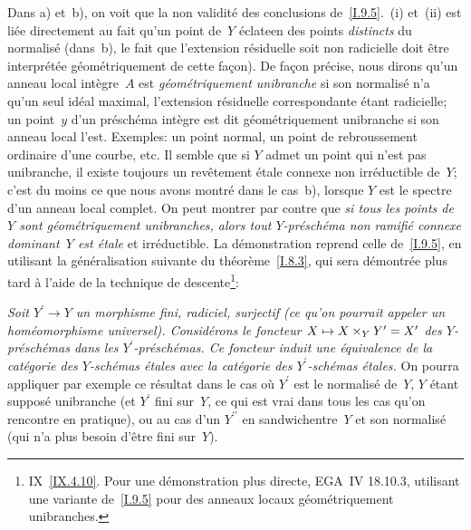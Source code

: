 Dans a) et~b), on voit que la non validit\'e des conclusions
de~\ref{I.9.5}.\, (i) et~(ii) est li\'ee directement au fait qu'un
point de~$Y$ \og \'eclate\fg en des points \emph{distincts} du
normalis\'e (dans~b),
le fait que l'extension r\'esiduelle soit non radicielle
doit \^etre interpr\'et\'ee g\'eom\'etriquement de cette
fa\c con). De fa\c con pr\'ecise, nous dirons qu'un anneau local
int\`egre~$A$ est \emph{géométriquement unibranche}
si son normalis\'e n'a qu'un seul id\'eal maximal, l'extension
r\'esiduelle correspondante \'etant radicielle; un point~$y$ d'un
pr\'esch\'ema int\`egre est dit g\'eom\'etriquement
unibranche si son anneau local l'est. Exemples: un point normal, un
point de rebroussement ordinaire d'une courbe, etc. Il semble que si
$Y$ admet un point qui
n'est pas unibranche, il existe toujours
un
rev\^etement \'etale
connexe non irr\'eductible de~$Y$; c'est du moins ce que nous avons
montr\'e dans le cas~b), lorsque $Y$ est le spectre d'un anneau
local complet. On peut montrer par contre que \emph{si tous les points
de~$Y$ sont géométriquement unibranches, alors tout
$Y$-préschéma non ramifié connexe dominant~$Y$ est
étale} et irr\'eductible. La d\'emonstration reprend celle
de~\ref{I.9.5}, en utilisant la g\'en\'eralisation suivante du
th\'eor\`eme~\ref{I.8.3}, qui sera d\'emontr\'ee plus tard
\`a l'aide de la technique de
descente\footnote{\Cf IX~\ref{IX.4.10}. Pour une d\'emonstration
plus directe, \cf EGA~IV 18.10.3, utilisant une variante
de~\ref{I.9.5} pour des anneaux locaux g\'eom\'etriquement
unibranches.}:

\emph{Soit $Y^\prime \to Y$ un morphisme fini, radiciel, surjectif
(\ie ce qu'on pourrait appeler un \og homéomorphisme
universel\fg). Considérons le foncteur $X \mto X \times_Y
Y^\prime = X^\prime$ des $Y$-préschémas dans les
$Y^\prime$-préschémas. Ce foncteur induit une équivalence
de la catégorie des $Y$-schémas étales avec la
catégorie des $Y^\prime$-schémas étales.} On pourra
appliquer par exemple ce r\'esultat dans le cas o\`u $Y^\prime$
est le normalis\'e de~$Y$, $Y$ \'etant suppos\'e unibranche (et
$Y^\prime$ fini sur~$Y$, ce qui est vrai dans tous les cas qu'on
rencontre en pratique), ou au cas d'un $Y^{\prime\prime}$ \og en
sandwich\fg entre~$Y$ et son normalis\'e (qui n'a plus besoin
d'\^etre fini sur~$Y$).

